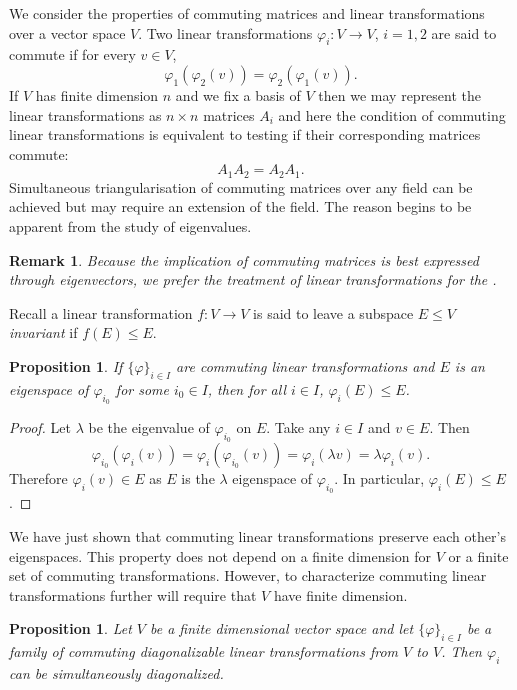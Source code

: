 \documentclass[12pt]{article}
\newtheorem{prop}[thm]{Proposition}
\newtheorem{remark}[thm]{Remark}
\begin{document}
We consider the properties of commuting matrices and linear transformations over a vector space $V$.  
Two linear transformations $\varphi_i:V\rightarrow V$, $i=1,2$ are said to commute if for every $v\in V$, $$\varphi_1(\varphi_2(v))=\varphi_2(\varphi_1(v)).$$  If $V$ has finite dimension $n$ and we fix a basis of $V$ then we may represent the linear transformations as $n\times n$ matrices $A_i$ and here the condition of commuting linear transformations is equivalent to testing if their corresponding matrices commute: $$A_1 A_2=A_2 A_1.$$  Simultaneous triangularisation of commuting matrices over any field can be achieved but may require an extension of the field.  The reason begins to be apparent from the study of eigenvalues.

\begin{remark}
Because the implication of commuting matrices is best expressed through eigenvectors, we prefer the treatment of linear transformations for the .
\end{remark}

Recall a linear transformation $f:V\rightarrow V$ is said to leave a subspace $E\leq V$ \emph{invariant} if $f(E)\leq E$.  

\begin{prop}
If $\{\varphi\}_{i\in I}$ are commuting linear transformations and $E$ is
an eigenspace of $\varphi_{i_0}$ for some $i_0\in I$, then for all $i\in I$,
$\varphi_i(E)\leq E$.
\end{prop}
\begin{proof}
Let $\lambda$ be the eigenvalue of $\varphi_{i_0}$ on $E$.  Take any $i\in I$
and $v\in E$.  Then
\[\varphi_{i_0}(\varphi_i(v))=\varphi_i(\varphi_{i_0}(v))=\varphi_i(\lambda v)
=\lambda \varphi_i(v).\]
Therefore $\varphi_i(v)\in E$ as $E$ is the $\lambda$ eigenspace of $\varphi_{i_0}$.  In particular, $\varphi_i(E)\leq E$.
\end{proof}

We have just shown that commuting linear transformations preserve each other's eigenspaces.  This property does not depend on a finite dimension for $V$ or a finite set of commuting transformations.  However, to characterize commuting linear transformations further will require that $V$ have finite dimension.

\begin{prop}
Let $V$ be a finite dimensional vector space and let 
$\{\varphi\}_{i\in I}$ be a family of commuting diagonalizable
linear transformations from $V$ to $V$.  Then $\varphi_i$
can be simultaneously diagonalized.
\end{prop}
\end{document}
